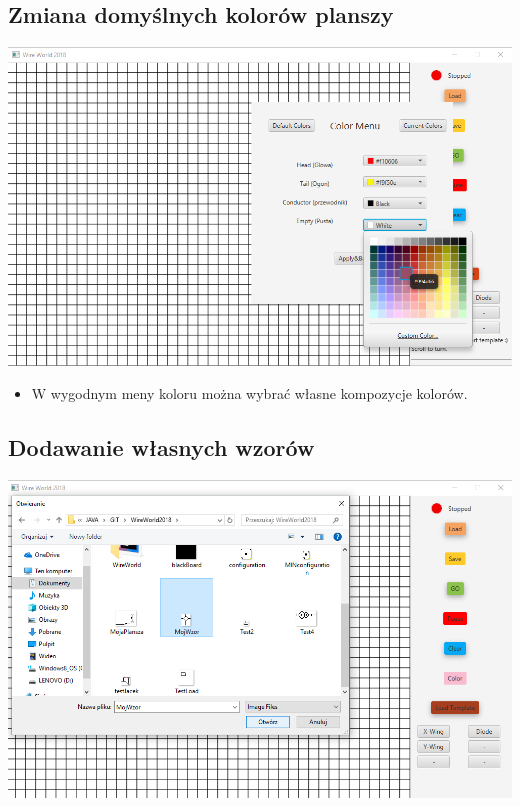 \documentclass[a4paper,11pt]{article}
\begin{document}
\subsection{ Zmiana domyślnych kolorów planszy}
\includegraphics[width=\textwidth]{colorMenu}
\begin{itemize}
\item W wygodnym meny koloru można wybrać własne kompozycje kolorów.
\end{itemize}
\subsection{Dodawanie własnych wzorów}
\includegraphics[width=\textwidth]{addWzor1}
\end{document}
